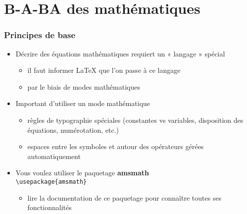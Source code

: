 \section{B-A-BA des mathématiques}


\begin{frame}[fragile]

	\frametitle{Principes de base}
	
	\begin{itemize}
		\item Décrire des équations mathématiques requiert un « langage » spécial
		\begin{itemize}
			\item il faut informer {\LaTeX} que l’on passe à ce langage
			\item par le biais de modes mathématiques
		\end{itemize}
	
		\item Important d’utiliser un mode mathématique
		\begin{itemize}
			\item règles de typographie spéciales (constantes vs variables, disposition des équations, 	numérotation, etc.)
			\item espaces entre les symboles et autour des opérateurs gérées automatiquement
		\end{itemize}
	
		\item Vous voulez utiliser le paquetage \textbf{amsmath} \\
			\lstinline|\usepackage{amsmath}|
			\begin{itemize}
				\item lire la documentation de ce paquetage pour connaître toutes ses fonctionnalités
			\end{itemize}
	\end{itemize}
\end{frame}


